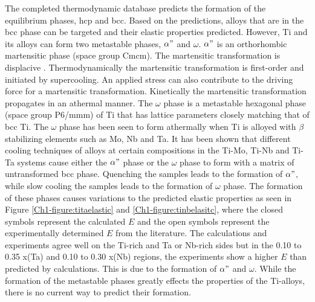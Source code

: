The completed thermodynamic database predicts the formation of the equilibrium phases, hcp and bcc. Based on the predictions, alloys that are in the bcc phase can be targeted and their elastic properties predicted. However, Ti and its alloys can form two metastable phases, $\alpha"$ and $\omega$. $\alpha"$ is an orthorhombic martensitic phase (space group Cmcm). The martensitic transformation is displacive \cite{Khachaturyan1985,Salje1990}. Thermodynamically the martensitic transformation is first-order and initiated by supercooling. An applied stress can also contribute to the driving force for a martensitic transformation. Kinetically the martensitic transformation propagates in an athermal manner. The $\omega$ phase is a metastable hexagonal phase (space group P6/mmm) of Ti that has lattice parameters closely matching that of bcc Ti. The $\omega$ phase has been seen to form athermally when Ti is alloyed with $\beta$ stabilizing elements such as Mo, Nb and Ta. It has been shown that different cooling techniques of alloys at certain compositions in the Ti-Mo, Ti-Nb and Ti-Ta systems cause either the $\alpha"$ phase or the $\omega$ phase to form with a matrix of untransformed bcc phase. Quenching the samples leads to the formation of $\alpha"$, while slow cooling the samples leads to the formation of $\omega$ phase. The formation of these phases causes variations to the predicted elastic properties as seen in Figure \ref{Ch1-figure:titaelastic} and \ref{Ch1-figure:tinbelasitc}, where the closed symbols represent the calculated $E$ and the open symbols represent the experimentally determined $E$ from the literature. The calculations and experiments agree well on the Ti-rich and Ta or Nb-rich sides but in the 0.10 to 0.35 x(Ta) and 0.10 to 0.30 x(Nb) regions, the experiments show a higher $E$ than predicted by calculations. This is due to the formation of $\alpha"$ and $\omega$. While the formation of the metastable phases greatly effects the properties of the Ti-alloys, there is no current way to predict their formation. 

